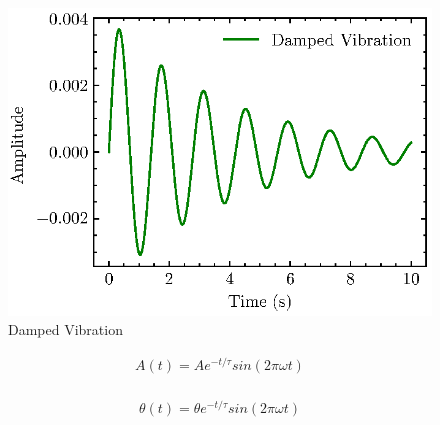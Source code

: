 \begin{figure}
    \centering
    \includegraphics{images/fig_chapter4/vib_damped.eps}
    \caption{Damped Vibration}
    \label{fig:damped_vib}
\end{figure}

\begin{equation}
  \label{eqn:vib_disp}
  \begin{aligned}
    A(t) = Ae^{-t/\tau}sin(2\pi\omega t) \\
  \end{aligned}
\end{equation}

\begin{equation}
  \label{eqn:vib_rot}
  \begin{aligned}
    \theta(t) = \theta e^{-t/\tau}sin(2\pi\omega t) \\
  \end{aligned}
\end{equation}

